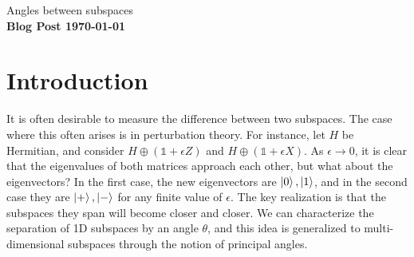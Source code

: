 \documentclass[11pt]{article}
\begin{document}
\noindent\huge{Angles between subspaces} \\
\normalsize\textbf{Blog Post \today}
 
\section{Introduction}
It is often desirable to measure the difference between two subspaces. The case where this often arises is in perturbation theory. For instance, let $H$ be Hermitian, and consider $H \oplus (\mathds 1 + \epsilon Z)$ and $H \oplus (\mathds 1 + \epsilon X)$. As $\epsilon \to 0$, it is clear that the eigenvalues of both matrices approach each other, but what about the eigenvectors? In the first case, the new eigenvectors are $\ket{0}, \ket{1}$, and in the second case they are $\ket{+}, \ket{-}$ for any finite value of $\epsilon$. The key realization is that the subspaces they span will become closer and closer. We can characterize the separation of 1D subspaces by an angle $\theta$, and this idea is generalized to multi-dimensional subspaces through the notion of principal angles.
\end{document}
